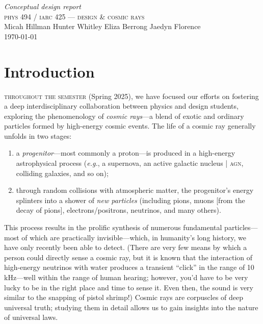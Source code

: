 \documentclass[12pt]{article}
\begin{document}
\thispagestyle{empty}
    \color{black!80}
    \begin{flushleft}
        \raggedright
        \vspace*{14em}
        \huge \textit{Conceptual design report} \\[0.3em]
        \normalsize \textsc{phys 494 / iarc 425 — design \& cosmic rays} \\[3em]
        \normalsize{
            Micah Hillman \hspace{0.8em} Hunter Whitley \hspace{0.8em} Eliza Berrong \hspace{0.8em} Jaedyn Florence\\[0.3em]
        }
        \vspace{12em}
        \normalsize\color{black!70} \today
    \end{flushleft}
\clearpage
\AddToShipoutPictureBG*{}  %

    \pagebreak
    \section{Introduction}\label{sec:intro}
    \textsc{throughout the semester} (Spring 2025), we have focused our efforts on fostering a deep interdisciplinary collaboration between physics and design students, exploring the phenomenology of \textit{cosmic rays}—a blend of exotic and ordinary particles formed by high-energy cosmic events. The life of a cosmic ray generally unfolds in two stages:
    \begin{enumerate}
        \item   a \textit{progenitor}—most commonly a proton—is produced in a high-energy astrophysical process (\textit{e.g.}, a supernova, an active galactic nucleus | \textsc{agn}, colliding galaxies, and so on);
        \item through random collisions with atmospheric matter, the progenitor's energy splinters into a shower of \textit{new particles} (including pions, muons [from the decay of pions], electrons/positrons, neutrinos, and many others).
    \end{enumerate}
    This process results in the prolific synthesis of numerous fundamental particles—most of which are practically invisible—which, in humanity's long history, we have only recently been able to detect. (There are very few means by which a person could directly sense a cosmic ray, but it is known that the interaction of high-energy neutrinos with water produces a transient ``click'' in the range of 10 kHz—well within the range of human hearing; however, you'd have to be very lucky to be in the right place and time to sense it. Even then, the sound is very similar to the snapping of pistol shrimp!) Cosmic rays are corpuscles of deep universal truth; studying them in detail allows us to gain insights into the nature of universal laws. 
    
\end{document}
